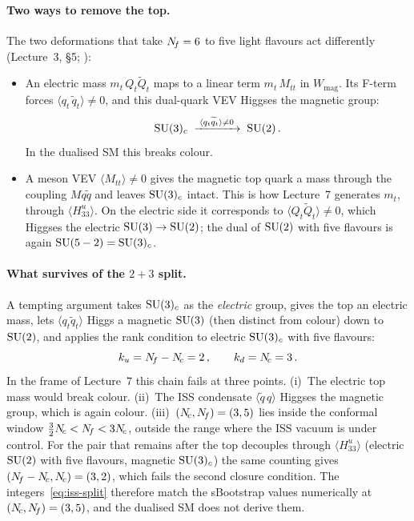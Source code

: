 \documentclass[11pt,a4paper]{article}
\begin{document}
\paragraph{Two ways to remove the top.}  The two deformations that
take $N_{\!f} = 6$ to five light flavours act differently
(Lecture~3, \S5; \cite{Seiberg1995}):
\begin{itemize}
\item An electric mass $m_t\,Q_t\widetilde Q_t$ maps to a linear term
  $m_t\,M_{tt}$ in $W_{\text{mag}}$.  Its F-term forces
  $\langle q_t\,\widetilde q_t\rangle \neq 0$, and this dual-quark
  VEV Higgses the magnetic group:
  \begin{equation}
    \mathrm{SU}(3)_c \;\xrightarrow{\;\langle q_t\widetilde q_t\rangle \neq 0\;}
    \;\mathrm{SU}(2)\,.
    \label{eq:higgsing}
  \end{equation}
  In the dualised SM this breaks colour.
\item A meson VEV $\langle M_{tt}\rangle \neq 0$ gives the magnetic
  top quark a mass through the coupling $M q\widetilde q$ and leaves
  $\mathrm{SU}(3)_c$ intact.  This is how Lecture~7 generates $m_t$, through
  $\langle H^u_{33}\rangle$.  On the electric side it corresponds to
  $\langle Q_t\widetilde Q_t\rangle \neq 0$, which Higgses the electric
  $\mathrm{SU}(3) \to \mathrm{SU}(2)$; the dual of $\mathrm{SU}(2)$ with five flavours is
  again $\mathrm{SU}(5-2) = \mathrm{SU}(3)_c$.
\end{itemize}

\paragraph{What survives of the $2+3$ split.}  A tempting argument
takes $\mathrm{SU}(3)_c$ as the \emph{electric} group, gives the top an
electric mass, lets $\langle q_t\widetilde q_t\rangle$ Higgs a
magnetic $\mathrm{SU}(3)$ (then distinct from colour) down to $\mathrm{SU}(2)$, and
applies the rank condition to electric $\mathrm{SU}(3)_c$ with five
flavours:
\begin{equation}
  k_u = N_{\!f} - N_{\!c} = 2\,,\qquad k_d = N_{\!c} = 3\,.
  \label{eq:iss-split}
\end{equation}
In the frame of Lecture~7 this chain fails at three points.
(i)~The electric top mass would break colour.
(ii)~The ISS condensate $\langle\widetilde q\,q\rangle$ Higgses the
magnetic group, which is again colour.
(iii)~$(N_{\!c},N_{\!f}) = (3,5)$ lies inside the conformal window
$\tfrac{3}{2}N_{\!c} < N_{\!f} < 3N_{\!c}$, outside the range where the ISS
vacuum is under control.  For the pair that remains after the top
decouples through $\langle H^u_{33}\rangle$ (electric $\mathrm{SU}(2)$ with
five flavours, magnetic $\mathrm{SU}(3)_c$) the same counting gives
$(N_{\!f}-N_{\!c},N_{\!c}) = (3,2)$, which fails the second closure condition.
The integers~\eqref{eq:iss-split} therefore match the sBootstrap
values numerically at $(N_{\!c},N_{\!f}) = (3,5)$, and the dualised SM does
not derive them.
\end{document}
